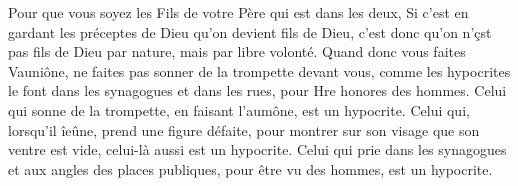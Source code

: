 Pour que vous soyez les Fils de votre Père qui est dans les deux, Si c’est en gardant les préceptes de Dieu qu’on devient fils de Dieu, c’est donc qu’on n’çst pas fils de Dieu par nature, mais par libre volonté. Quand donc vous faites Vauniône, ne faites pas sonner de la trompette devant vous, comme les hypocrites le font dans les synagogues et dans les rues, pour Hre honores des hommes. Celui qui sonne de la trompette, en faisant l’aumône, est un hypocrite. Celui qui, lorsqu’il îeûne, prend une figure défaite, pour montrer sur son visage que son ventre est vide, celui-là aussi est un hypocrite. Celui qui prie dans les synagogues et aux angles des places publiques, pour être vu des hommes, est un hypocrite.
